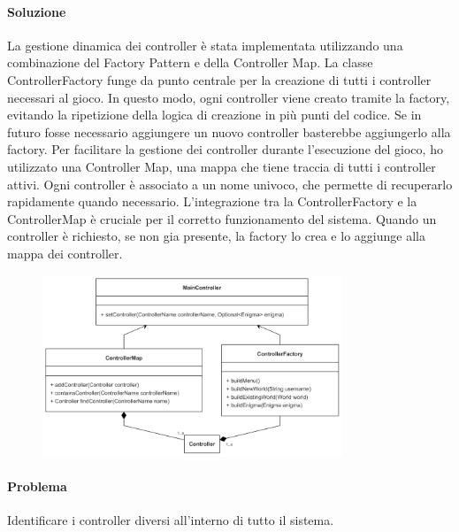 \documentclass[a4paper,12pt]{report}
\begin{document}
\paragraph{Soluzione} La gestione dinamica dei controller è stata implementata utilizzando una combinazione del Factory Pattern e della Controller Map. La classe ControllerFactory funge da punto centrale per la creazione di tutti i controller necessari al gioco. In questo modo, ogni controller viene creato tramite la factory, evitando la ripetizione della logica di creazione in più punti del codice. Se in futuro fosse necessario aggiungere un nuovo controller basterebbe aggiungerlo alla factory. Per facilitare la gestione dei controller durante l’esecuzione del gioco, ho utilizzato una Controller Map, una mappa che tiene traccia di tutti i controller attivi. Ogni controller è associato a un nome univoco, che permette di recuperarlo rapidamente quando necessario. L’integrazione tra la ControllerFactory e la ControllerMap è cruciale per il corretto funzionamento del sistema. Quando un controller è richiesto, se non gia presente, la factory lo crea e lo aggiunge alla mappa dei controller.
%
\begin{figure}   %
    \centering
    \includegraphics[width=0.8\textwidth]{img/maincontroller.png}  %
    \label{img:maincontroller}
\end{figure}

\paragraph{Problema} Identificare i controller diversi all’interno di tutto il sistema.
\end{document}
